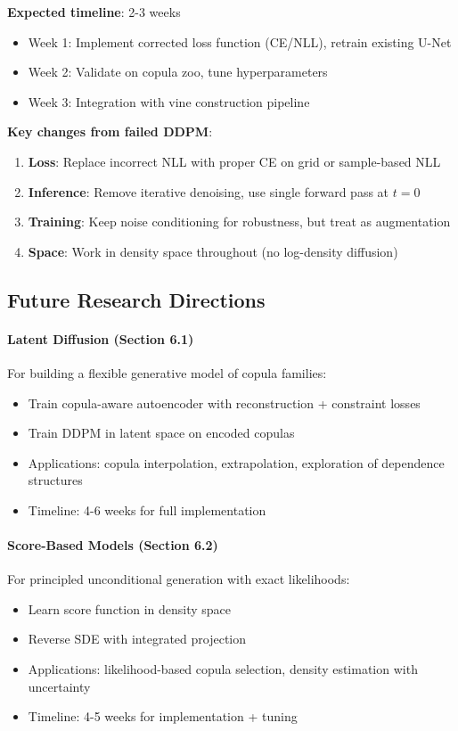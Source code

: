 \documentclass[11pt]{article}
\begin{document}
\textbf{Expected timeline}: 2-3 weeks
\begin{itemize}
    \item Week 1: Implement corrected loss function (CE/NLL), retrain existing U-Net
    \item Week 2: Validate on copula zoo, tune hyperparameters
    \item Week 3: Integration with vine construction pipeline
\end{itemize}

\textbf{Key changes from failed DDPM}:
\begin{enumerate}
    \item \textbf{Loss}: Replace incorrect NLL with proper CE on grid or sample-based NLL
    \item \textbf{Inference}: Remove iterative denoising, use single forward pass at $t=0$
    \item \textbf{Training}: Keep noise conditioning for robustness, but treat as augmentation
    \item \textbf{Space}: Work in density space throughout (no log-density diffusion)
\end{enumerate}

\subsection{Future Research Directions}

\paragraph{Latent Diffusion (Section 6.1)}
For building a flexible generative model of copula families:
\begin{itemize}
    \item Train copula-aware autoencoder with reconstruction + constraint losses
    \item Train DDPM in latent space on encoded copulas
    \item Applications: copula interpolation, extrapolation, exploration of dependence structures
    \item Timeline: 4-6 weeks for full implementation
\end{itemize}

\paragraph{Score-Based Models (Section 6.2)}
For principled unconditional generation with exact likelihoods:
\begin{itemize}
    \item Learn score function in density space
    \item Reverse SDE with integrated projection
    \item Applications: likelihood-based copula selection, density estimation with uncertainty
    \item Timeline: 4-5 weeks for implementation + tuning
\end{itemize}
\end{document}
